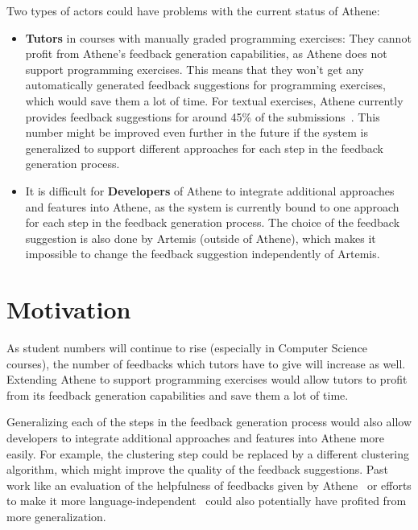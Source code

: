 Two types of actors could have problems with the current status of Athene:
\begin{itemize}
    \item \textbf{Tutors} in courses with manually graded programming exercises: They cannot profit from Athene's feedback generation capabilities, as Athene does not support programming exercises. This means that they won't get any automatically generated feedback suggestions for programming exercises, which would save them a lot of time.
    For textual exercises, Athene currently provides feedback suggestions for around 45\% of the submissions~\cite{cofee2}. This number might be improved even further in the future if the system is generalized to support different approaches for each step in the feedback generation process.
    \item It is difficult for \textbf{Developers} of Athene to integrate additional approaches and features into Athene, as the system is currently bound to one approach for each step in the feedback generation process. The choice of the feedback suggestion is also done by Artemis (outside of Athene), which makes it impossible to change the feedback suggestion independently of Artemis.
\end{itemize}

\section*{Motivation}

As student numbers will continue to rise (especially in Computer Science courses), the number of feedbacks which tutors have to give will increase as well. Extending Athene to support programming exercises would allow tutors to profit from its feedback generation capabilities and save them a lot of time.

Generalizing each of the steps in the feedback generation process would also allow developers to integrate additional approaches and features into Athene more easily.
For example, the clustering step could be replaced by a different clustering algorithm, which might improve the quality of the feedback suggestions. Past work like an evaluation of the helpfulness of feedbacks given by Athene~\cite{atheneTracking} or efforts to make it more language-independent~\cite{atheneLanguage} could also potentially have profited from more generalization.

